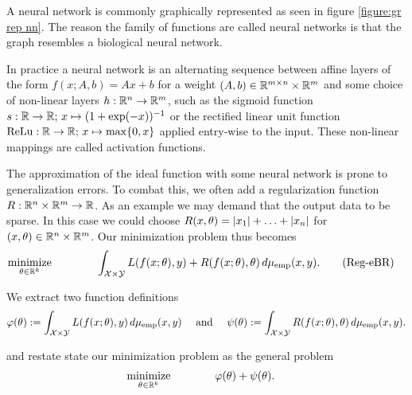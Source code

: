 A neural network is commonly graphically represented as seen in
figure \ref{figure:gr rep nn}. The reason the family
of functions are called neural networks is that
the graph resembles a biological neural network.\medskip

In practice a neural network is an alternating sequence between 
affine layers of the form $ f(x;A,b)=Ax+b $ for a weight 
$ (A,b)\in\mathbb{R}^{m\times n}\times \mathbb{R}^m $
and some choice of non-linear layers $ h:\mathbb{R}^n\rightarrow\mathbb{R}^m $,
such as the sigmoid function 
$ s:\mathbb{R}\rightarrow \mathbb{R};\,x\mapsto (1+\exp(-x))^{-1} $ or
the rectified linear unit function
$ \mathrm{ReLu}:\mathbb{R}\rightarrow \mathbb{R};\,x\mapsto\max\{0,x\} $
applied entry-wise to the input. These non-linear mappings
are called activation functions.\medskip

The approximation of the ideal function with some neural network
is prone to generalization errors. To combat this, we often add
a regularization function $ R:\mathbb{R}^n\times \mathbb{R}^m\rightarrow \mathbb{R} $. 
As an example we may demand that the 
output data to be sparse. In this case we could choose
$ R(x,\theta)=\left\vert x_1\right\vert+\ldots+\left\vert x_n\right\vert $ for 
$ (x,\theta)\in\mathbb{R}^{n}\times\mathbb{R}^m $. Our minimization
problem thus becomes 
\begin{align*}\label{equation:reg emp Bayes Risk}
	\operatorname*{\mathrm{minimize}}_{\theta\in \mathbb{R}^k}
	\qquad &\qquad
	\int_{\mathcal{X}\times \mathcal{Y}} L(f(x;\theta),y)+R(f(x;\theta),\theta)\,d\mu_{\mathrm{emp}}(x,y).
	\tag{Reg-eBR}
\end{align*}

We extract two function definitions 
\begin{align*}
	\varphi(\theta):=\int_{\mathcal{X}\times \mathcal{Y}} L(f(x;\theta),y)\,d\mu_{\mathrm{emp}}(x,y)
	\quad\text{ and }\quad
	\psi(\theta):=\int_{\mathcal{X}\times \mathcal{Y}} R(f(x;\theta),\theta)\,d\mu_{\mathrm{emp}}(x,y).
\end{align*}

and restate state our minimization problem as the general problem
\begin{align*}
	\operatorname*{\mathrm{minimize}}_{\theta\in \mathbb{R}^k}
	\qquad &\qquad
	\varphi(\theta)+\psi(\theta).
\end{align*}


